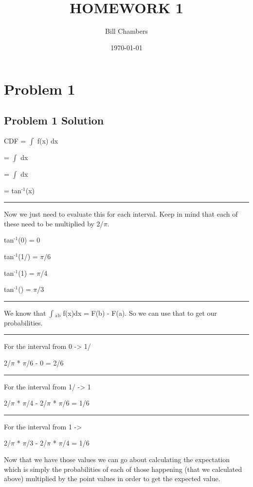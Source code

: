 \documentclass[11pt]{article}
\author{Bill Chambers}
\date{\today}
\title{HOMEWORK 1}
\begin{document}
\maketitle
\tableofcontents


\section{Problem 1}
\label{sec-1}
\subsection{Problem 1 Solution}
\label{sec-1-1}
CDF = $\int$ f(x) dx

= $\int$ dx

= $\int$ dx

= tan$^{\text{-1}}$(x)

\rule{\linewidth}{0.5pt}

Now we just need to evaluate this for each interval. Keep in mind that each of these need to be multiplied by 2/$\pi$.

tan$^{\text{-1}}$(0) = 0

tan$^{\text{-1}}$(1/) = $\pi$/6

tan$^{\text{-1}}$(1) = $\pi$/4

tan$^{\text{-1}}$() = $\pi$/3

\rule{\linewidth}{0.5pt}

We know that $\int$$_{\text{a}}$$_{\text{b}}$ f(x)dx = F(b) - F(a). So we can use that to get our probabilities.

\rule{\linewidth}{0.5pt}

For the interval from 0 -> 1/

2/$\pi$ * $\pi$/6 - 0 = 2/6


\rule{\linewidth}{0.5pt}

For the interval from 1/ -> 1

2/$\pi$ * $\pi$/4 - 2/$\pi$ * $\pi$/6 = 1/6


\rule{\linewidth}{0.5pt}

For the interval from 1 -> 

2/$\pi$ * $\pi$/3 - 2/$\pi$ * $\pi$/4 = 1/6


Now that we have those values we can go about calculating the expectation which is simply the probabilities of each of those happening (that we calculated above) multiplied by the point values in order to get the expected value.
\end{document}
